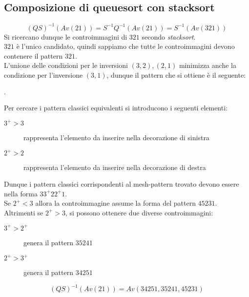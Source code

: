 \subsection*{Composizione  di {queuesort} con {stacksort}}
$$(QS)^{-1}(Av(21))=S^{-1}Q^{-1}(Av(21))=S^{-1}(Av(321))$$
Si ricercano dunque le controimmagini di $321$ secondo \textit{stacksort}.\\$321$ \`e l'unico candidato, quindi sappiamo che tutte le controimmagini devono contenere il pattern $321$.\\
L'unione delle condizioni per le inversioni $(3,2),(2,1)$ minimizza anche la condizione per l'inversione $(3,1)$, dunque il pattern che si ottiene \`e il seguente:
\begin{center}
.
\end{center}
Per cercare i pattern classici equivalenti si introducono i seguenti elementi:
\begin{description}
	\item[$3^+>3$] rappresenta l'elemento da inserire nella decorazione di sinistra
	\item[$2^+>2$] rappresenta l'elemento da inserire nella decorazione di destra
\end{description}
Dunque i pattern classici corrispondenti al mesh-pattern trovato devono essere nella forma $33^+22^+1$.\\
Se $2^+<3$ allora la controimmagine assume la forma del pattern $45231$.\\
Altrimenti se $2^+>3$, si possono ottenere due diverse controimmagini:
\begin{description}
	\item[$3^+>2^+$] genera il pattern $35241$
	\item[$2^+>3^+$] genera il pattern $34251$
\end{description}
$$(QS)^{-1}(Av(21)) = Av(34251, 35241, 45231)$$
